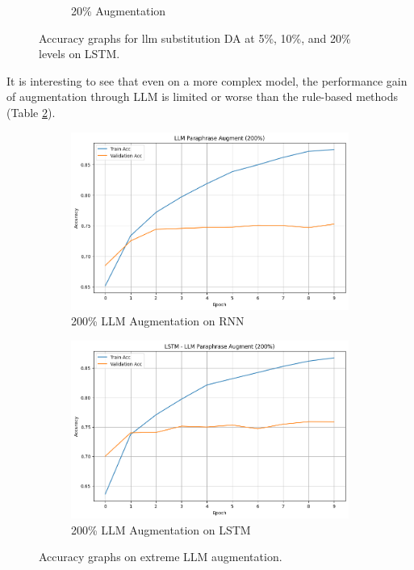\documentclass{article}
\begin{document}
\begin{figure}[ht]
\begin{subfigure}[b]{0.3\textwidth}
    \caption{20\% Augmentation}
    \label{fig:llm_20_lstm}
  \end{subfigure}
  \caption{Accuracy graphs for llm substitution DA at 5\%, 10\%, and 20\% levels on LSTM.}
  \label{fig:llm_lstm_substitution_accuracy}
\end{figure}

It is interesting to see that even on a more complex model, the performance
gain of augmentation through LLM is limited or worse than the rule-based
methods (Table \ref{fig:llm_lstm_substitution_accuracy}).

\begin{figure}[ht]
  \centering
  \begin{subfigure}[b]{0.45\textwidth}
    \includegraphics[width=\textwidth]{img/llm_200_rnn.png}
    \caption{200\% LLM Augmentation on RNN}
    \label{fig:llm_200_rnn}
  \end{subfigure}
  \hfill
  \begin{subfigure}[b]{0.45\textwidth}
    \includegraphics[width=\textwidth]{img/llm_200_lstm.png}
    \caption{200\% LLM Augmentation on LSTM}
    \label{fig:llm_200_lstm}
  \end{subfigure}
  \caption{Accuracy graphs on extreme LLM augmentation.}
  \label{fig:llm_extreme_substitution_acc}
\end{figure}
\end{document}
